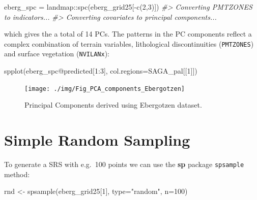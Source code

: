 \documentclass[
  graybox,natbib,nospthms]{svmono}
\newenvironment{Shaded}{\begin{snugshade}}{\end{snugshade}}
\newcommand{\AttributeTok}[1]{\textcolor[rgb]{0.61,0.61,0.61}{#1}}
\newcommand{\CommentTok}[1]{\textcolor[rgb]{0.37,0.37,0.37}{\textit{#1}}}
\newcommand{\DecValTok}[1]{\textcolor[rgb]{0.06,0.06,0.06}{#1}}
\newcommand{\FunctionTok}[1]{\textcolor[rgb]{0,0,0}{#1}}
\newcommand{\NormalTok}[1]{#1}
\newcommand{\OtherTok}[1]{\textcolor[rgb]{0.37,0.37,0.37}{#1}}
\newcommand{\SpecialCharTok}[1]{\textcolor[rgb]{0,0,0}{#1}}
\newcommand{\StringTok}[1]{\textcolor[rgb]{0.5,0.5,0.5}{#1}}
\begin{document}
\begin{Shaded}
\begin{Highlighting}[]
\NormalTok{eberg\_spc }\OtherTok{=}\NormalTok{ landmap}\SpecialCharTok{::}\FunctionTok{spc}\NormalTok{(eberg\_grid25[}\SpecialCharTok{{-}}\FunctionTok{c}\NormalTok{(}\DecValTok{2}\NormalTok{,}\DecValTok{3}\NormalTok{)])}
\CommentTok{\#\textgreater{} Converting PMTZONES to indicators...}
\CommentTok{\#\textgreater{} Converting covariates to principal components...}
\end{Highlighting}
\end{Shaded}

which gives the a total of 14 PCs. The patterns in the PC components reflect
a complex combination of terrain variables, lithological discontinuities (\texttt{PMTZONES})
and surface vegetation (\texttt{NVILANx}):

\begin{Shaded}
\begin{Highlighting}[]
\FunctionTok{spplot}\NormalTok{(eberg\_spc}\SpecialCharTok{@}\NormalTok{predicted[}\DecValTok{1}\SpecialCharTok{:}\DecValTok{3}\NormalTok{], }\AttributeTok{col.regions=}\NormalTok{SAGA\_pal[[}\DecValTok{1}\NormalTok{]])}
\end{Highlighting}
\end{Shaded}

\begin{figure}

{\centering \texttt{[image: ./img/Fig\_PCA\_components\_Ebergotzen]} 

}

\caption{Principal Components derived using Ebergotzen dataset.}\label{fig:plot-spc}
\end{figure}

\hypertarget{simple-random-sampling}{%
\section{Simple Random Sampling}\label{simple-random-sampling}}

To generate a SRS with e.g.~100 points we can use the \textbf{sp} package \texttt{spsample} method:

\begin{Shaded}
\begin{Highlighting}[]
\NormalTok{rnd }\OtherTok{\textless{}{-}} \FunctionTok{spsample}\NormalTok{(eberg\_grid25[}\DecValTok{1}\NormalTok{], }\AttributeTok{type=}\StringTok{"random"}\NormalTok{, }\AttributeTok{n=}\DecValTok{100}\NormalTok{)}
\end{Highlighting}
\end{Shaded}
\end{document}
